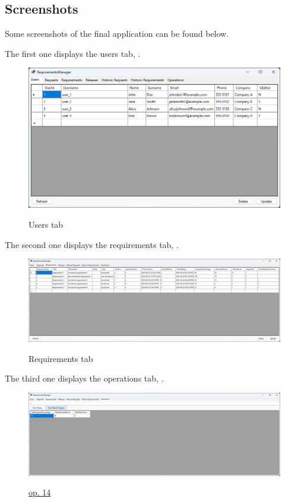 \documentclass[12pt, a4paper]{report}
\begin{document}
\subsection*{Screenshots}

Some screenshots of the final application can be found below.

The first one displays the users tab, .

\begin{figure}[H]
\centering
\caption{Users tab}
\includegraphics[width=\textwidth]{app-users}
\label{fig:app_users}
\end{figure}

The second one displays the requirements tab, .

\begin{figure}[H]
\centering
\caption{Requirements tab}
\includegraphics[width=\textwidth]{app-requirements}
\label{fig:app_requirements}
\end{figure}

The third one displays the operations tab, .

\begin{figure}[H]
\centering
\caption{\hyperref[subsubsec:op14]{op. 14}}
\includegraphics[width=\textwidth]{app-op14}
\label{fig:app_op14}
\end{figure}


\end{document}

